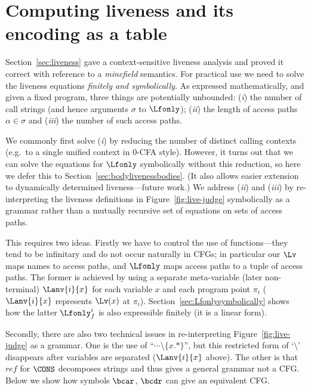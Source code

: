 \documentclass{llncs}
\begin{document}

\section{Computing liveness and its encoding as a table}\label{sec:computing}

Section~\ref{sec:liveness} gave a context-sensitive liveness analysis
and proved it correct with reference to a {\em minefield} semantics.
For practical use we need to solve the liveness equations {\em finitely and
symbolically}.  As expressed mathematically, and given a fixed program,
three things are potentially unbounded:
({\em i\/}) the number of call strings (and hence arguments $\sigma$ to $\Lfonly$);
({\em ii\/}) the length of access paths $\alpha \in \sigma$ and
({\em iii\/}) the number of such access paths.

We commonly first solve ({\em i\/}) by reducing the number of distinct
calling contexts
(e.g.\ to a single unified context in 0-CFA style).
However, it turns out that we can solve the equations for $\Lfonly$ symbolically
without this reduction, so here we defer this to Section~\ref{sec:bodylivenessbodies}.
(It also allows easier extension to  dynamically determined liveness---future work.)
%
We address ({\em ii\/}) and ({\em iii\/}) by 
re-interpreting
the liveness definitions in Figure~\ref{fig:live-judge} symbolically as a grammar
rather than a mutually recursive set of equations on sets of access paths.

This requires two ideas.  Firstly we have to control the use of functions---they
tend to be infinitary and do not occur naturally in CFGs; in particular our
$\Lv$ maps names to access paths, and  $\Lfonly$ maps access paths
to a tuple of access paths.  The former is achieved by using a separate
meta-variable (later non-terminal)
$\Lanv{i}{x}$ for each variable $x$ and each program point $\pi_i$
($\Lanv{i}{x}$ represents $\Lv(x)$ at $\pi_i$).
Section~\ref{sec:Lfonlysymbolically} shows how the latter $\Lfonly_f^i$ is also
expressible finitely (it is a linear form).

Secondly, there are also two technical issues in re-interpreting
Figure~\ref{fig:live-judge} as a grammar.
One is the use of ``$\cdots \setminus \{x.*\}$'', but this restricted form of `$\setminus$'
disappears after variables are separated ($\Lanv{i}{x}$ above). The other
is that $\mathit{ref}$ for $\CONS$ decomposes strings and thus gives a general grammar
not a CFG\@.
Below we show how symbols $\bcar$, $\bcdr$ can give an equivalent CFG\@.
\end{document}
